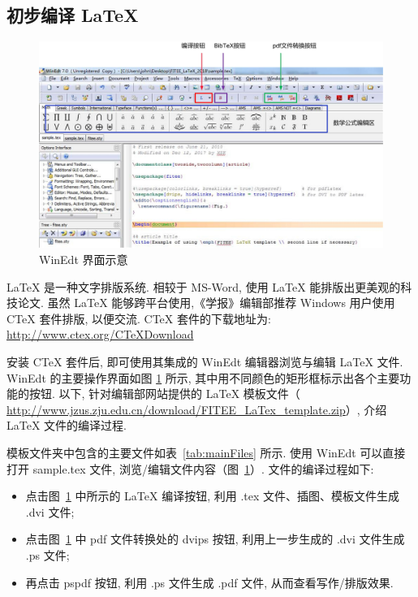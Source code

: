 \documentclass[twoside,twocolumn]{article}
\begin{document}
\begin{CJK}{UTF8}{song}
\maketitle



\section{初步编译 \LaTeX{}} \label{sec:introduction}


\begin{figure}[!t]\small
\centering
\includegraphics[width = 16.4cm]{latexSum/desktop2.jpg}
\caption{WinEdt 界面示意}
\label{fig:ui}
\end{figure}

\LaTeX{} 是一种文字排版系统. 相较于 MS-Word, 使用 \LaTeX{} 能排版出更美观的科技论文. 
虽然 \LaTeX{} 能够跨平台使用,《学报》编辑部推荐 Windows 用户使用 CTeX 套件排版, 以便交流. 
CTeX 套件的下载地址为: 
\url{http://www.ctex.org/CTeXDownload}

安装 CTeX 套件后, 即可使用其集成的 WinEdt 编辑器浏览与编辑 \LaTeX{} 文件. 
WinEdt 的主要操作界面如图 \ref{fig:ui} 所示, 其中用不同颜色的矩形框标示出各个主要功能的按钮. 以下, 
针对编辑部网站提供的 \LaTeX{} 模板文件（ \url{http://www.jzus.zju.edu.cn/download/FITEE_LaTex_template.zip}）, 
介绍 \LaTeX{} 文件的编译过程. 

模板文件夹中包含的主要文件如表~\ref{tab:mainFiles} 所示. 使用 WinEdt 可以直接打开 sample.tex 文件, 
浏览/编辑文件内容（图~\ref{fig:ui}）. 文件的编译过程如下: 
\begin{itemize}
  \item 点击图~\ref{fig:ui} 中所示的 \LaTeX{} 编译按钮, 利用 .tex 文件、插图、模板文件生成 .dvi 文件;
  \item 点击图~\ref{fig:ui} 中 pdf 文件转换处的 dvips 按钮, 利用上一步生成的 .dvi 文件生成 .ps 文件;
  \item 再点击 pspdf 按钮, 利用 .ps 文件生成 .pdf 文件, 从而查看写作/排版效果.
\end{itemize}


\end{CJK}
\end{document}
